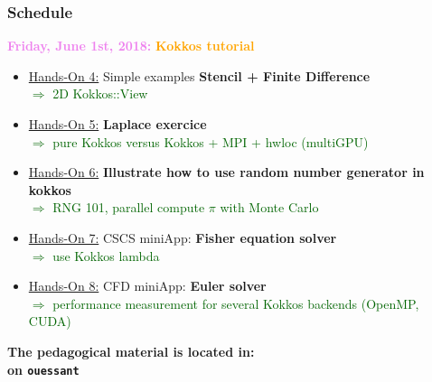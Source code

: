 \begin{frame}
  \frametitle{Schedule}

  {\bf \large \textcolor{violet}{Friday, June 1st, 2018:}} \textcolor{orange}{\bf Kokkos tutorial}
  \begin{itemize}
  \item \textcolor{blue}{\hyperlink{handson4}{Hands-On 4:}} Simple examples \textbf{Stencil + Finite Difference}\\
    \textcolor{darkgreen}{$\Rightarrow$ 2D Kokkos::View}
  \item \textcolor{blue}{\hyperlink{handson5}{Hands-On 5:}} \textbf{Laplace exercice}\\
    \textcolor{darkgreen}{$\Rightarrow$ pure Kokkos versus Kokkos + MPI + hwloc (multiGPU)}
  \item \textcolor{blue}{\hyperlink{handson6}{Hands-On 6:}} \textbf{Illustrate how to use random number generator in kokkos}\\
    \textcolor{darkgreen}{$\Rightarrow$ RNG 101, parallel compute $\pi$ with Monte Carlo}
  \item \textcolor{blue}{\hyperlink{handson7}{Hands-On 7:}} CSCS miniApp: \textbf{Fisher equation solver}\\
    \textcolor{darkgreen}{$\Rightarrow$ use Kokkos lambda}
  \item \textcolor{blue}{\hyperlink{handson8}{Hands-On 8:}} CFD miniApp: \textbf{Euler solver}\\
    \textcolor{darkgreen}{$\Rightarrow$ performance measurement for several Kokkos backends (OpenMP, CUDA)}
  \end{itemize}

  \vfill
  {\bf The pedagogical material is located in:\\
   on \texttt{ouessant}}

\end{frame}
